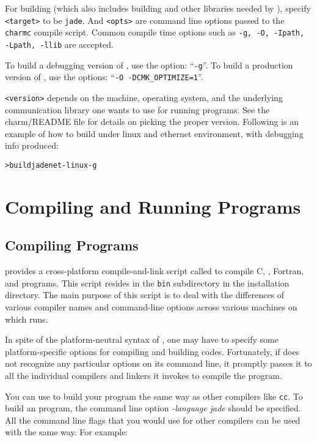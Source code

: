 \documentclass[10pt]{article}
\begin{document}
For building \jade (which also includes building \charmpp{} and other
libraries needed by \jade), specify \verb+<target>+ to be \verb+jade+. And
\verb+<opts>+ are command line options passed to the \verb+charmc+ compile
script.  Common compile time options such as \texttt{-g, -O, -Ipath, -Lpath,
-llib} are accepted. 

To build a debugging version of \jade, use the option: ``\texttt{-g}''. 
To build a production version of \jade, use the options: ``\texttt{-O 
-DCMK\_OPTIMIZE=1}''.

\verb+<version>+ depends on the machine, operating system, and the underlying
communication library one wants to use for running \jade programs.
See the charm/README file for details on picking the proper version.
Following is an example of how to build \jade under linux and ethernet
environment, with debugging info produced:

\begin{alltt}
> build jade net-linux -g
\end{alltt}

\section{Compiling and Running \jade Programs}
\subsection{Compiling \jade Programs}

\charmpp{} provides a cross-platform compile-and-link script called \charmc{}
to compile C, \CC{}, Fortran, \charmpp{} and \jade programs.  This script
resides in the \texttt{bin} subdirectory in the \charmpp{} installation
directory. The main purpose of this script is to deal with the differences of
various compiler names and command-line options across various machines on
which \charmpp{} runs.

In spite of the platform-neutral syntax of \charmc{}, one may have to specify
some platform-specific options for compiling and building \jade codes.
Fortunately, if \charmc{} does not recognize any particular options on its
command line, it promptly passes it to all the individual compilers and linkers
it invokes to compile the program.

You can use \charmc{} to build your \jade program the same way as other
compilers like \texttt{cc}.  To build an \jade program, the command line 
option \emph{-language jade} should be specified. All the command line 
flags that you would use for other compilers can be used with \charmc the 
same way. For example:
\end{document}
